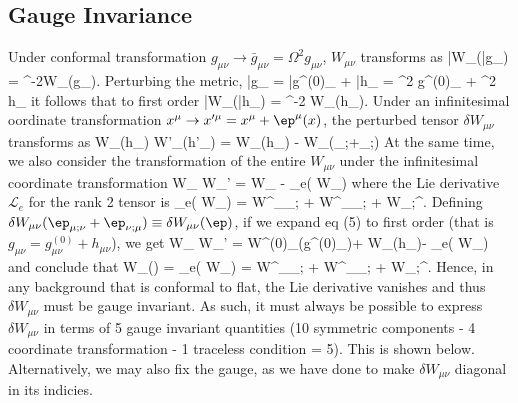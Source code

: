 \documentclass[10pt,letterpaper]{article}
\begin{document}
\subsection{Gauge Invariance}
Under conformal transformation $g_{\mu\nu} \to \bar{g}_{\mu\nu} = \Omega^2 g_{\mu\nu}$, $W_{\mu\nu}$ transforms as
\be
	\bar W_{\mu\nu}(\bar g_{\mu\nu}) =  \Omega^{-2}W_{\mu\nu}(g_{\mu\nu}).
\ee
Perturbing the metric, 
\be
	\bar g_{\mu\nu} = \bar g^{(0)}_{\mu\nu} + \bar h_{\mu\nu} = \Omega^2 g^{(0)}_{\mu\nu} + \Omega^2 h_{\mu\nu}
\ee
it follows that to first order
\be
	\delta \bar W_{\mu\nu}(\bar h_{\mu\nu}) = \Omega^{-2} \delta W_{\mu\nu}(h_{\mu\nu}).
\ee
Under an infinitesimal oordinate transformation $x^\mu \to x'^\mu = x^\mu + \ep^\mu(x)$, the perturbed tensor $\delta W_{\mu\nu}$ transforms as
\be
	\delta W_{\mu\nu}(h_{\mu\nu}) \to \delta W'_{\mu\nu}(h'_{\mu\nu}) = \delta W_{\mu\nu}(h_{\mu\nu}) - \delta W_{\mu\nu}(\ep_{\mu;\nu}+\ep_{\nu;\mu})
\ee
At the same time, we also consider the transformation of the entire $W_{\mu\nu}$ under the infinitesimal coordinate transformation
\be
	W_{\mu\nu} \to W_{\mu\nu}' = W_{\mu\nu} - _e( W_{\mu\nu})
\ee
where the Lie derivative $\mathcal L_e$ for the rank 2 tensor is
\be
	 _e( W_{\mu\nu}) = W^{\lambda}{}_\mu \ep_{\lambda;\nu} + W^{\lambda}{}_\nu \ep_{\lambda;\mu} + W_{\mu\nu;\lambda}\ep^\lambda.
\ee
Defining $\delta W_{\mu\nu}(\ep_{\mu;\nu}+\ep_{\nu;\mu}) \equiv \delta W_{\mu\nu}(\ep)$, if we expand eq (5) to first order (that is $g_{\mu\nu} = g^{(0)}_{\mu\nu} + h_{\mu\nu}$), we get
\be
	W_{\mu\nu} \to W_{\mu\nu}' = W^{(0)}_{\mu\nu}(g^{(0)}_{\mu\nu})+ \delta W_{\mu\nu}(h_{\mu\nu})- _e( W_{\mu\nu})
\ee
and conclude that
\be
	 \delta W_{\mu\nu}(\ep) =  _e( W_{\mu\nu}) = W^{\lambda}{}_\mu \ep_{\lambda;\nu} + W^{\lambda}_\nu \ep_{\lambda;\mu} + W_{\mu\nu;\lambda}\ep^\lambda.
\ee
Hence, in any background that is conformal to flat, the Lie derivative vanishes and thus $\delta W_{\mu\nu}$ must be gauge invariant. As such, it must always be possible to express $\delta W_{\mu\nu}$ in terms of 5 gauge invariant quantities (10 symmetric components - 4 coordinate transformation - 1 traceless condition = 5). This is shown below. Alternatively, we may also fix the gauge, as we have done to make $\delta W_{\mu\nu}$ diagonal in its indicies. 
\\ \\
\end{document}
